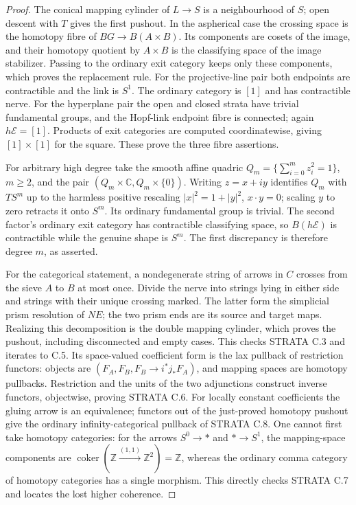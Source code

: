 \begin{proof}
The conical mapping cylinder of $L\to S$ is a neighbourhood of $S$;
open descent with $T$ gives the first pushout. In the aspherical
case the crossing space is the homotopy fibre of
$BG\to B(A\times B)$. Its components are cosets of the image,
and their homotopy quotient by $A\times B$ is the classifying space
of the image stabilizer. Passing to the ordinary exit category
keeps only these components, which proves the replacement rule.
For the projective-line pair both endpoints are contractible and
the link is $S^1$. The ordinary category is $[1]$ and has
contractible nerve. For the hyperplane pair the open and closed
strata have trivial fundamental groups, and the Hopf-link endpoint
fibre is connected; again $h\mathcal E=[1]$. Products of exit
categories are computed coordinatewise, giving $[1]\times[1]$
for the square. These prove the three fibre assertions.

For arbitrary high degree take the smooth affine quadric
$Q_m=\{\sum_{i=0}^{m}z_i^2=1\}$, $m\geq2$, and the pair
$(Q_m\times\mathbb C,Q_m\times\{0\})$. Writing $z=x+iy$
identifies $Q_m$ with $TS^m$ up to the harmless positive rescaling
$|x|^2=1+|y|^2$, $x\cdot y=0$; scaling $y$ to zero retracts it
onto $S^m$. Its ordinary fundamental group is trivial.
The second factor's ordinary exit category has contractible
classifying space, so $B(h\mathcal E)$ is contractible while the
genuine shape is $S^m$. The first discrepancy is therefore degree
$m$, as asserted.

For the categorical statement, a nondegenerate string of arrows
in $C$ crosses from the sieve $A$ to $B$ at most once. Divide the
nerve into strings lying in either side and strings with their
unique crossing marked. The latter form the simplicial prism
resolution of $NE$; the two prism ends are its source and target
maps. Realizing this decomposition is the double mapping cylinder,
which proves the pushout, including disconnected and empty cases.
This checks STRATA C.3 and iterates to C.5. Its space-valued
coefficient form is the lax pullback of restriction functors:
objects are $(F_A,F_B,F_B\to i^*j_*F_A)$, and mapping spaces are
homotopy pullbacks. Restriction and the units of the two adjunctions
construct inverse functors, objectwise, proving STRATA C.6.
For locally constant coefficients the gluing arrow is an equivalence;
functors out of the just-proved homotopy pushout give the ordinary
infinity-categorical pullback of STRATA C.8. One cannot first take
homotopy categories: for the arrows $S^0\to *$ and $*\to S^1$,
the mapping-space components are
$\operatorname{coker}(\mathbb Z\xrightarrow{(1,1)}\mathbb Z^2)
=\mathbb Z$, whereas the ordinary comma category of homotopy
categories has a single morphism. This directly checks STRATA C.7
and locates the lost higher coherence.
\end{proof}

